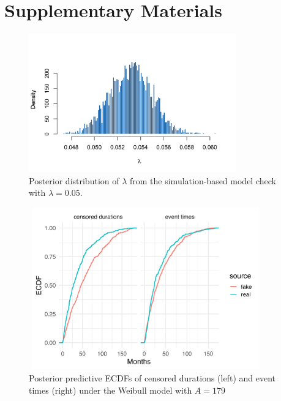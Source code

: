 \pagebreak
\section*{Supplementary Materials}


\setcounter{figure}{0}
\setcounter{table}{0}

\renewcommand{\thefigure}{S\arabic{figure}}
\renewcommand{\thetable}{S\arabic{table}}

\begin{figure}[H]
  \centering
  \includegraphics[width=0.8\textwidth]{images/simulation-based_model_check.png}
  \caption{{\small Posterior distribution of $\lambda$ from the simulation-based model check with $\lambda=0.05$.}}
  \label{fig:posterior_s1}
\end{figure}

\begin{figure}[H]
    \centering
    \includegraphics[height=7cm, width=0.9\textwidth]{images/weibull_ecdf.png}
    \caption{{\small Posterior predictive ECDFs of censored durations (left) and event times (right) under the Weibull model with $A=179$}}
    \label{fig:weibull}
\end{figure}